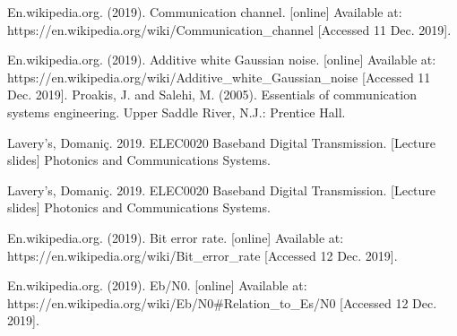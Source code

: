 \documentclass[12pt]{article}
\begin{document}
    
     
    \newpage   
    \begin{thebibliography}{9}
    En.wikipedia.org. (2019). Communication channel. [online] Available at: https://en.wikipedia.org/wiki/Communication\_channel [Accessed 11 Dec. 2019].
      
    En.wikipedia.org. (2019). Additive white Gaussian noise. [online] Available at: https://en.wikipedia.org/wiki/Additive\_white\_Gaussian\_noise [Accessed 11 Dec. 2019].
    Proakis, J. and Salehi, M. (2005). Essentials of communication systems engineering. Upper Saddle River, N.J.: Prentice Hall.
        
    Lavery's, Domaniç.  2019.  ELEC0020 Baseband Digital Transmission. [Lecture slides] Photonics and Communications Systems.
        
    Lavery's, Domaniç.  2019.  ELEC0020 Baseband Digital Transmission. [Lecture slides] Photonics and Communications Systems.
    
    
    En.wikipedia.org. (2019). Bit error rate. [online] Available at: https://en.wikipedia.org/wiki/Bit\_error\_rate [Accessed 12 Dec. 2019].
    
    En.wikipedia.org. (2019). Eb/N0. [online] Available at: https://en.wikipedia.org/wiki/Eb/N0#Relation\_to\_Es/N0 [Accessed 12 Dec. 2019].
        
    \end{thebibliography}
\end{document}

